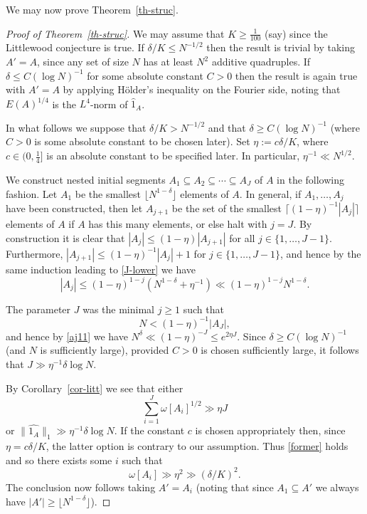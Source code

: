 \documentclass[reqno]{amsart}
\newcommand{\anorm}[1]{\| \widehat{#1}\|}
\renewcommand{\leq}{\leqslant}
\renewcommand{\geq}{\geqslant}
\newcommand{\abs}[1]{\left\lvert #1\right\rvert}
\numberwithin{equation}{section}
\theoremstyle{definition}
\theoremstyle{remark}
\begin{document}
We may now prove Theorem~\ref{th-struc}.
\begin{proof}[Proof of Theorem~\ref{th-struc}] We may assume that $K \geq \frac{1}{100}$ (say) since the Littlewood conjecture is true. If $\delta/K \leq N^{-1/2}$ then the result is trivial by taking $A' = A$, since any set of size $N$ has at least $N^2$ additive quadruples.  If $\delta \leq C(\log N)^{-1}$ for some absolute constant $C>0$ then the result is again true with $A' = A$ by applying H\"older's inequality on the Fourier side, noting that $E(A)^{1/4}$ is the $L^4$-norm of $\widehat{1}_A$.

In what follows we suppose that $\delta/K > N^{-1/2}$ and that $\delta \geq C (\log N)^{-1}$ (where $C>0$ is some absolute constant to be chosen later).
Set $\eta := c\delta/K$, where $c \in (0,\frac{1}{4}]$ is an absolute constant to be specified later. In particular, $\eta^{-1} \ll N^{1/2}$.

We construct nested initial segments $A_1 \subseteq A_2 \subseteq \cdots \subseteq A_J$ of $A$ in the following fashion. Let $A_1$ be the smallest $\lfloor N^{1-\delta}\rfloor$ elements of $A$. In general, if $A_1,\ldots,A_j$ have been constructed, then let $A_{j+1}$ be the set of the smallest $\lceil (1-\eta)^{-1}\abs{A_j}\rceil$ elements of $A$ if $A$ has this many elements, or else halt with $j = J$. By construction it is clear that $\abs{A_j}\leq (1-\eta)\abs{A_{j+1}}$ for all $j \in \{1,\dots, J-1\}$. Furthermore, $\abs{A_{j+1}}\leq (1-\eta)^{-1}\abs{A_j}+1$ for $j \in \{1,\dots, J-1\}$, and hence by the same induction leading to \eqref{J-lower} we have
\begin{equation}\label{aj11}\abs{A_{j}}\leq (1-\eta)^{1-j}(N^{1-\delta}+ \eta^{-1}) \ll (1 - \eta)^{1 - j} N^{1 - \delta}.\end{equation}

The parameter $J$ was the minimal $j\geq 1$ such that
\[N< (1-\eta)^{-1}\abs{A_J},\]
and hence by \eqref{aj11} we have $N^\delta \ll (1-\eta)^{-J} \leq e^{2\eta J}$. Since $\delta \geq C(\log N)^{-1}$ (and $N$ is sufficiently large), provided $C>0$ is chosen sufficiently large, it follows that $J\gg \eta^{-1}\delta \log N$. 

By Corollary~\ref{cor-litt} we see that either
\begin{equation}\label{former} \sum_{i = 1}^J \omega[A_i]^{1/2}\gg \eta J\end{equation}
or $\anorm{1_A}_1 \gg \eta^{-1}\delta \log N$. If the constant $c$ is chosen appropriately then, since $\eta = c \delta/K$, the latter option is contrary to our assumption. Thus \eqref{former} holds and so there exists some $i$ such that
\[ \omega[A_i] \gg \eta^2\gg (\delta/K)^2.\]
The conclusion now follows taking $A'=A_{i}$ (noting that since $A_1\subseteq A'$ we always have $\abs{A'}\geq \lfloor N^{1-\delta}\rfloor$). 
\end{proof}
\end{document}
